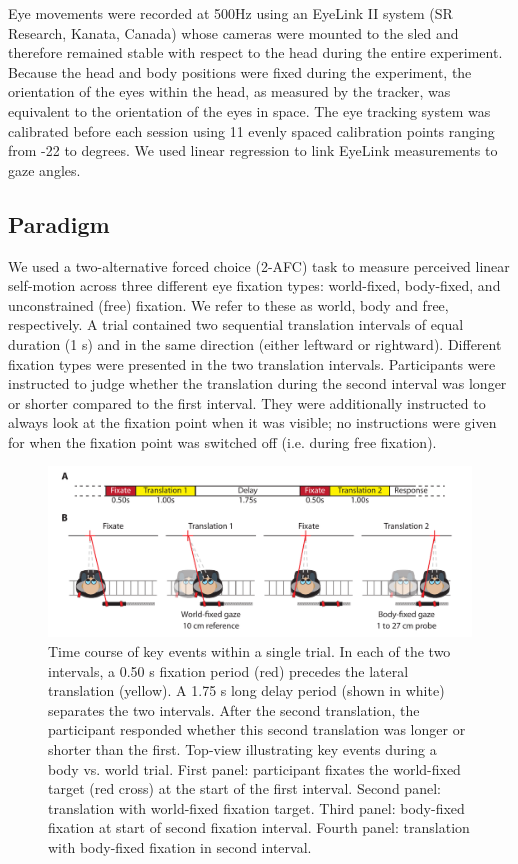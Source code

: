 Eye movements were recorded at 500\si{\hertz} using an EyeLink II system (SR Research, Kanata, Canada) whose cameras were mounted to the sled and therefore remained stable with respect to the head during the entire experiment. Because the head and body positions were fixed during the experiment, the orientation of the eyes within the head, as measured by the tracker, was equivalent to the orientation of the eyes in space. The eye tracking system was calibrated before each session using 11 evenly spaced calibration points ranging from -22 to  degrees. We used linear regression to link EyeLink measurements to gaze angles.

\subsection{Paradigm}
We used a two-alternative forced choice (2-AFC) task to measure perceived linear self-motion across three different eye fixation types: world-fixed, body-fixed, and unconstrained (free) fixation. We refer to these as world, body and free, respectively. A trial contained two sequential translation intervals of equal duration (1 \si{\second}) and in the same direction (either leftward or rightward). Different fixation types were presented in the two translation intervals. Participants were instructed to judge whether the translation during the second interval was longer or shorter compared to the first interval. They were additionally instructed to always look at the fixation point when it was visible; no instructions were given for when the fixation point was switched off (i.e. during free fixation).


\begin{figure}
    \includegraphics[width=1.0\textwidth]{src/paper3/figure1.pdf}

    \caption{ Time course of key events within a single trial. In each of the two intervals, a 0.50 \si{\second} fixation period (red) precedes the lateral translation (yellow). A 1.75 \si{\second} long delay period (shown in white) separates the two intervals. After the second translation, the participant responded whether this second translation was longer or shorter than the first.  Top-view illustrating key events during a body vs. world trial. First panel: participant fixates the world-fixed target (red cross) at the start of the first interval. Second panel: translation with world-fixed fixation target. Third panel: body-fixed fixation at start of second fixation interval. Fourth panel: translation with body-fixed fixation in second interval.}
    \label{p3:fig1}
\end{figure}

